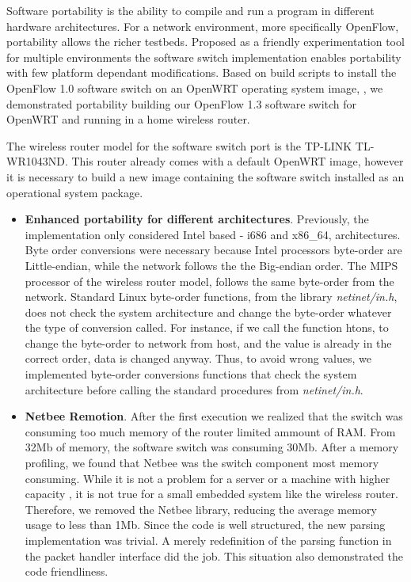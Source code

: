 Software portability is the ability to compile and run a program in different hardware architectures. For a network environment, more specifically OpenFlow, portability allows the richer testbeds. Proposed as a friendly experimentation tool for multiple environments the software switch implementation enables portability with few platform dependant modifications. Based on build scripts to install the OpenFlow 1.0 software switch on an OpenWRT \cite{OpenWrt} operating system image, \cite{yiakoumis2011}, we demonstrated portability building our OpenFlow 1.3 software switch for OpenWRT and running in a home wireless router.

The wireless router model for the software switch port is the TP-LINK TL-WR1043ND. This router already comes with a default OpenWRT image, however it is necessary to build a new image containing the software switch installed as an operational system package. 

\begin{itemize}
\item \textbf{Enhanced portability for different architectures}. Previously, the implementation only considered Intel based - i686 and x86_64, architectures. Byte order conversions were necessary because Intel processors byte-order are Little-endian, while the network follows the the Big-endian order.  The MIPS processor of the wireless router model, follows the same byte-order from the network. Standard Linux byte-order functions, from the library \textit{netinet/in.h}, does not check the system architecture and change the byte-order whatever the type of conversion called. For instance, if we call the function htons, to change the byte-order to network from host, and the value is already in the correct order, data is changed anyway. Thus, to avoid wrong values, we implemented byte-order conversions functions that check the system architecture before calling the standard procedures from \textit{netinet/in.h}.
\item \textbf{Netbee Remotion}. After the first execution we realized that the switch was consuming too much memory of the router limited ammount of RAM. From 32Mb of memory, the software switch was consuming 30Mb. After a memory profiling, we found that Netbee was the switch component most memory consuming. While it is not a problem for a server or a machine with higher capacity , it is not true for a small embedded system like the wireless router. Therefore, we removed the Netbee library, reducing the average memory usage to less than 1Mb. Since the code is well structured, the new parsing implementation was trivial. A merely redefinition of the parsing function in the packet handler interface did the job. This situation also demonstrated the code friendliness. 

\end{itemize}


